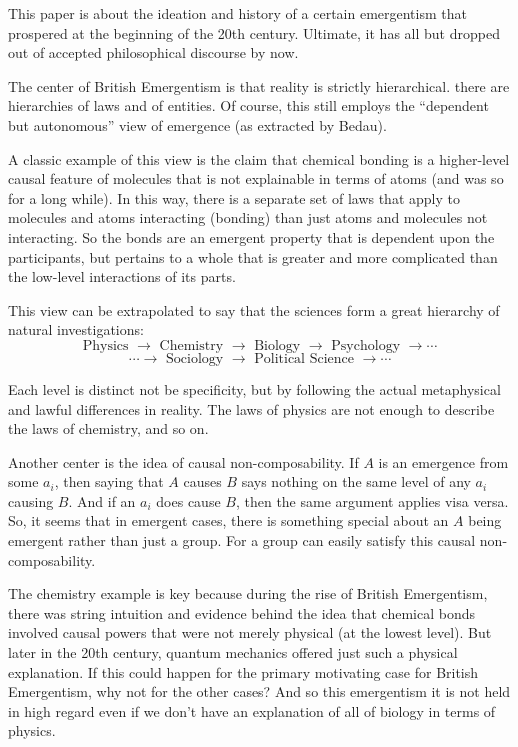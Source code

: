 \documentclass{article}
\newcommand{\tx}[1]{\text{#1}}
\begin{document}
This paper is about the ideation and history of a certain emergentism that prospered at the beginning of the 20th century. Ultimate, it has all but dropped out of accepted philosophical discourse by now.

The center of British Emergentism is that reality is strictly hierarchical. there are hierarchies of laws and of entities. Of course, this still employs the ``dependent but autonomous'' view of emergence (as extracted by Bedau).

A classic example of this view is the claim that chemical bonding is a higher-level causal feature of molecules that is not explainable in terms of atoms (and was so for a long while). In this way, there is a separate set of laws that apply to molecules and atoms interacting (bonding) than just atoms and molecules not interacting. So the bonds are an emergent property that is dependent upon the participants, but pertains to a whole that is greater and more complicated than the low-level interactions of its parts.

This view can be extrapolated to say that the sciences form a great hierarchy of natural investigations:
\[
    \tx{Physics } \rightarrow
    \tx{ Chemistry } \rightarrow
    \tx{ Biology } \rightarrow
    \tx{ Psychology } \rightarrow \cdots \] \[ \cdots \rightarrow
    \tx{ Sociology } \rightarrow
    \tx{ Political Science } \rightarrow \cdots
\]

Each level is distinct not be specificity, but by following the actual metaphysical and lawful differences in reality. The laws of physics are not enough to describe the laws of chemistry, and so on.

Another center is the idea of causal non-composability. If $A$ is an emergence from some $a_i$, then saying that $A$ causes $B$ says nothing on the same level of any $a_i$ causing $B$. And if an $a_i$ does cause $B$, then the same argument applies visa versa. So, it seems that in emergent cases, there is something special about an $A$ being emergent rather than just a group. For a group can easily satisfy this causal non-composability.


The chemistry example is key because during the rise of British Emergentism, there was string intuition and evidence behind the idea that chemical bonds involved causal powers that were not merely physical (at the lowest level). But later in the 20th century, quantum mechanics offered just such a physical explanation. If this could happen for the primary motivating case for British Emergentism, why not for the other cases? And so this emergentism it is not held in high regard even if we don't have an explanation of all of biology in terms of physics.
\end{document}
